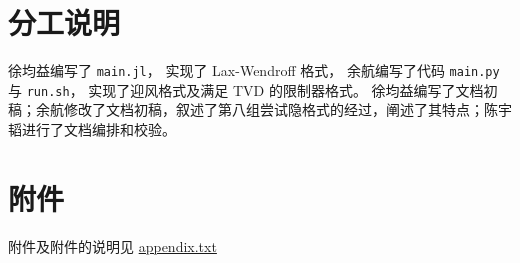 \documentclass[10.5pt
]{article}
\begin{document}
\section{分工说明}
徐均益编写了 \verb|main.jl|，
实现了 Lax-Wendroff 格式，
余航编写了代码 \verb|main.py| 与 \verb|run.sh|，
实现了迎风格式及满足 TVD 的限制器格式。
徐均益编写了文档初稿；余航修改了文档初稿，叙述了第八组尝试隐格式的经过，阐述了其特点；陈宇韬进行了文档编排和校验。

\section{附件\protect\footnotemark}
附件及附件的说明见 \href{./appendix.txt}{appendix.txt} 


% 
%


\end{document}
